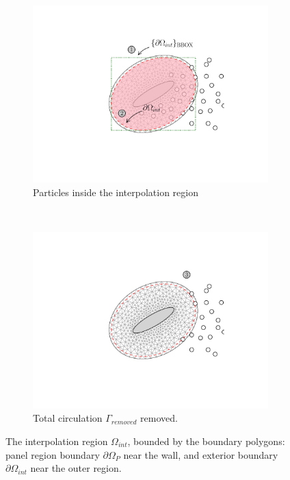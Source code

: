 	\begin{figure}[!b]
     \centering
     \begin{subfigure}[t]{0.49\textwidth}
             \includegraphics[trim=4.37cm 1.58cm 3.86cm 1.58cm, clip, width=\linewidth]{./figures/hybrid/interpolation/ellipse/interpRegion.pdf}
             \caption{Particles inside the interpolation region}
             \label{fig:region}
     \end{subfigure}%
     ~ %
     \begin{subfigure}[t]{0.49\textwidth}
             \includegraphics[trim=4.37cm 1.58cm 3.86cm 1.58cm, clip, width=\linewidth]{./figures/hybrid/interpolation/ellipse/particleRemoved.pdf}
             \caption{Total circulation $\Gamma_{removed}$ removed.}
             \label{fig:removed}
     \end{subfigure}

     \caption{The interpolation region $\Omega_{int}$, bounded by the boundary polygons: panel region boundary $\partial \Omega_P$ near the wall, and exterior boundary $\partial \Omega_{int}$ near the outer region.}
     \label{fig:interpRegionEllipse}
	\end{figure}	

